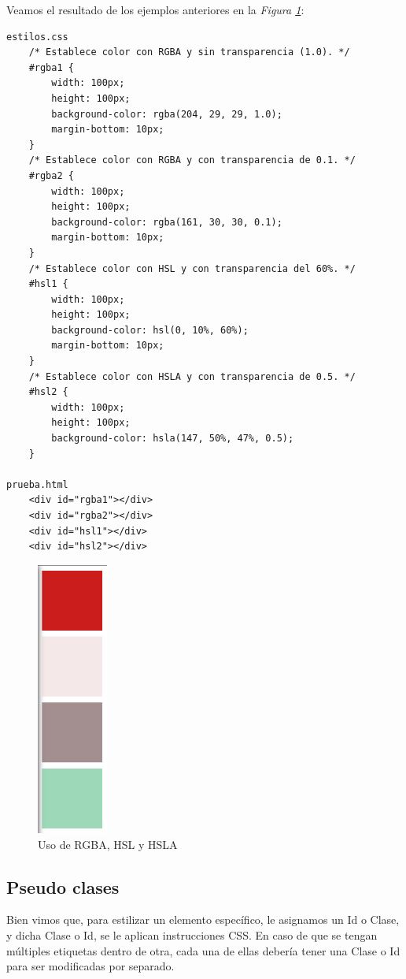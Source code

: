 Veamos el resultado de los ejemplos anteriores en la \textit{Figura \ref{fig: 37}}:
\begin{lstlisting}
estilos.css
    /* Establece color con RGBA y sin transparencia (1.0). */
    #rgba1 {
        width: 100px;
        height: 100px;
        background-color: rgba(204, 29, 29, 1.0);
        margin-bottom: 10px;
    }
    /* Establece color con RGBA y con transparencia de 0.1. */
    #rgba2 {
        width: 100px;
        height: 100px;
        background-color: rgba(161, 30, 30, 0.1);
        margin-bottom: 10px;
    }
    /* Establece color con HSL y con transparencia del 60%. */
    #hsl1 {
        width: 100px;
        height: 100px;
        background-color: hsl(0, 10%, 60%);
        margin-bottom: 10px;
    }
    /* Establece color con HSLA y con transparencia de 0.5. */
    #hsl2 {
        width: 100px;
        height: 100px;
        background-color: hsla(147, 50%, 47%, 0.5);
    }

prueba.html
    <div id="rgba1"></div>
    <div id="rgba2"></div>
    <div id="hsl1"></div>
    <div id="hsl2"></div>
\end{lstlisting}
\begin{figure}[H]
    \centering
    \caption{Uso de RGBA, HSL y HSLA}
    \label{fig: 37}
    \includegraphics[height=9cm]{ss/rgba,hsl,hsla.png}
\end{figure}


\subsection{Pseudo clases}

Bien vimos que, para estilizar un elemento específico, le asignamos un Id o Clase, y dicha Clase o Id, se le aplican instrucciones CSS. En caso de que se tengan múltiples etiquetas dentro de otra, cada una de ellas debería tener una Clase o Id para ser modificadas por separado.


